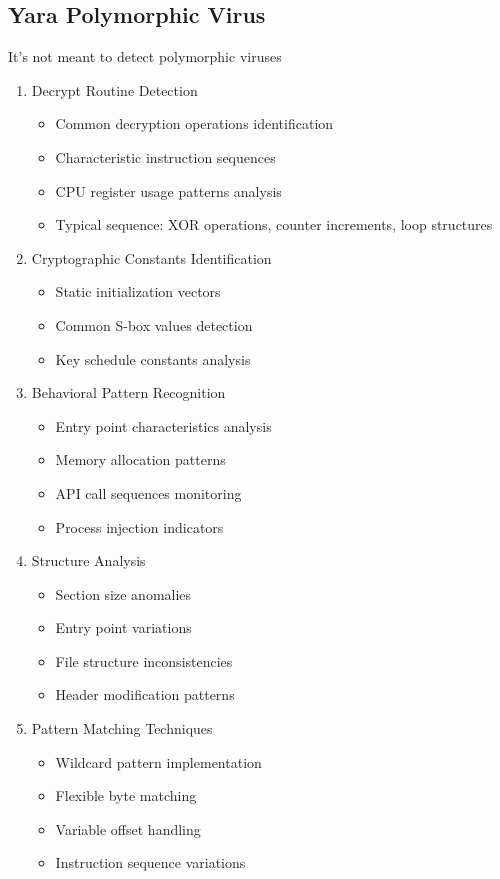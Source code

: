 \subsection*{Yara Polymorphic Virus}
It's not meant to detect polymorphic viruses
\begin{enumerate}
    \item Decrypt Routine Detection
    \begin{itemize}
        \item Common decryption operations identification
        \item Characteristic instruction sequences
        \item CPU register usage patterns analysis
        \item Typical sequence: XOR operations, counter increments, loop structures
    \end{itemize}

    \item Cryptographic Constants Identification
    \begin{itemize}
        \item Static initialization vectors
        \item Common S-box values detection
        \item Key schedule constants analysis
    \end{itemize}

    \item Behavioral Pattern Recognition
    \begin{itemize}
        \item Entry point characteristics analysis
        \item Memory allocation patterns
        \item API call sequences monitoring
        \item Process injection indicators
    \end{itemize}

    \item Structure Analysis
    \begin{itemize}
        \item Section size anomalies
        \item Entry point variations
        \item File structure inconsistencies
        \item Header modification patterns
    \end{itemize}

    \item Pattern Matching Techniques
    \begin{itemize}
        \item Wildcard pattern implementation
        \item Flexible byte matching
        \item Variable offset handling
        \item Instruction sequence variations
    \end{itemize}


\end{enumerate}
